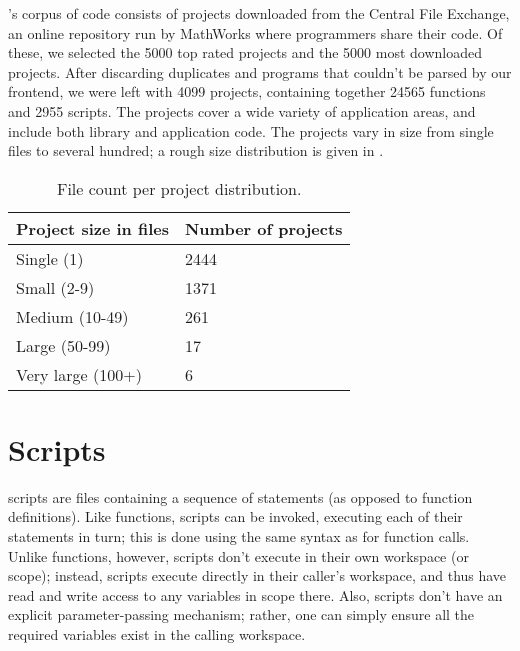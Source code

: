 



\mcbench's corpus of \matlab code consists of projects downloaded from the
\matlab Central File Exchange, an online repository run by MathWorks where
\matlab programmers share their code. Of these, we selected the 5000 top rated
projects and the 5000 most downloaded projects. After discarding duplicates and
programs that couldn't be parsed by our \matlab frontend, we were left with
4099 projects, containing together 24565 functions and 2955 scripts. The
projects cover a wide variety of application areas, and include both library
and application code. The projects vary in size from single files to several
hundred; a rough size distribution is given in .

\begin{table}
\centering
\begin{tabular}{| l | l |}
\hline
Project size in files & Number of projects \\ \hline
Single (1) & 2444 \\ \hline
Small (2-9) & 1371 \\ \hline
Medium (10-49) & 261 \\ \hline
Large (50-99) & 17 \\ \hline
Very large (100+) & 6 \\ \hline
\end{tabular}
\caption{File count per project distribution.}
\label{tab:1}
\end{table}

\section{Scripts}

\matlab scripts are files containing a sequence of statements (as opposed to
function definitions). Like functions, scripts can be invoked, executing each
of their statements in turn; this is done using the same syntax as for function
calls. Unlike functions, however, scripts don't execute in their own workspace
(or scope); instead, scripts execute directly in their caller's workspace, and
thus have read and write access to any variables in scope there. Also, scripts
don't have an explicit parameter-passing mechanism; rather, one can simply
ensure all the required variables exist in the calling workspace.

